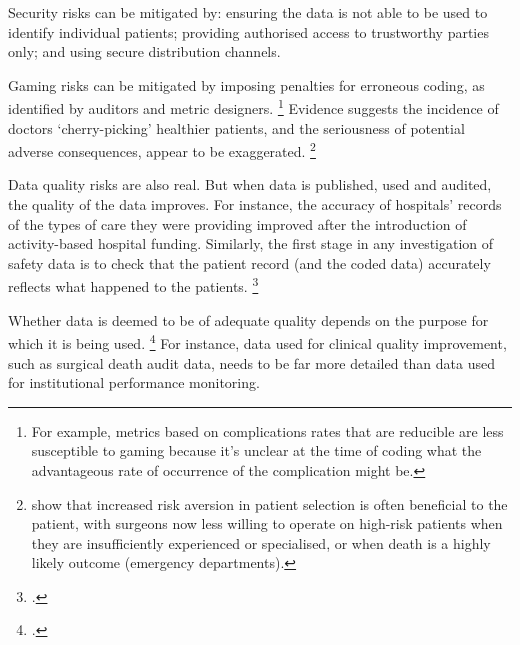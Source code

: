 \documentclass[FrontPage]{grattan}
\begin{document}
Security risks can be mitigated by: ensuring the data is not able to be used to identify individual patients; providing authorised access to trustworthy parties only; and using secure distribution channels.

Gaming risks can be mitigated by imposing penalties for erroneous coding, as identified by auditors and metric designers.%
	\footnote{For example, metrics based on complications rates that are reducible are less susceptible to gaming because it's unclear at the time of coding what the advantageous rate of occurrence of the complication might be.}
Evidence suggests the incidence of doctors `cherry-picking' healthier patients, and the seriousness of potential adverse consequences, appear to be exaggerated.%
	\footnote{\textcite{tweddell2017there} show that increased risk aversion in patient selection is often beneficial to the patient, with surgeons now less willing to operate on high-risk patients when they are insufficiently experienced or specialised, or when death is a highly likely outcome (emergency departments).}

Data quality risks are also real.
But when data is published, used and audited, the quality of the data improves.
For instance, the accuracy of hospitals' records of the types of care they were providing improved after the introduction of activity-based hospital funding.
Similarly, the first stage in any investigation of safety data is to check that the patient record (and the coded data) accurately reflects what happened to the patients.%
	\footcite{duckett2007identifying}

Whether data is deemed to be of adequate quality depends on the purpose for which it is being used.%
	\footcite{damschroder2014effects}
For instance, data used for clinical quality improvement, such as surgical death audit data, needs to be far more detailed than data used for institutional performance monitoring.










\printbibliography
\end{document}
